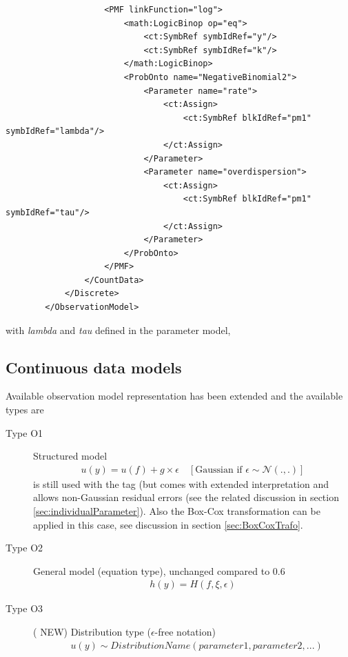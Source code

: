 \begin{itemize}
\begin{lstlisting}
                    <PMF linkFunction="log">
                        <math:LogicBinop op="eq">
                            <ct:SymbRef symbIdRef="y"/>
                            <ct:SymbRef symbIdRef="k"/>
                        </math:LogicBinop>
                        <ProbOnto name="NegativeBinomial2">
                            <Parameter name="rate">
                                <ct:Assign>
                                    <ct:SymbRef blkIdRef="pm1" symbIdRef="lambda"/>
                                </ct:Assign>
                            </Parameter>
                            <Parameter name="overdispersion">
                                <ct:Assign>
                                    <ct:SymbRef blkIdRef="pm1" symbIdRef="tau"/>
                                </ct:Assign>
                            </Parameter>
                        </ProbOnto>
                    </PMF>
                </CountData>
            </Discrete>
        </ObservationModel>
\end{lstlisting}
with \emph{lambda} and \emph{tau} defined in the parameter model, 
\end{itemize}


\subsection{Continuous data models}
\label{subsec:contModels}
Available observation model representation has been extended and the available types are
\begin{description} 
\item[Type O1] Structured model 
\begin{align*}
	u(y) = u(f) + g \times \epsilon \quad [\text{Gaussian if } \epsilon \sim \mathcal N(.,.)]
\end{align*}
is still used with the  tag (but comes with extended interpretation 
and allows non-Gaussian residual errors (see the related discussion in section 
\ref{sec:individualParameter}). Also the Box-Cox transformation can be applied 
in this case, see discussion in section \ref{sec:BoxCoxTrafo}.
\item[Type O2] General model (equation type), unchanged compared to 0.6
\begin{align*}
	h(y) = H(f, \xi, \epsilon)
\end{align*}

\item[Type O3] ({\color{red} \scshape{NEW}}) Distribution type ($\epsilon$-free notation) 
\begin{align*}
	& u(y)  \sim DistributionName(parameter1, parameter2, ...)
\end{align*}

\end{description}

